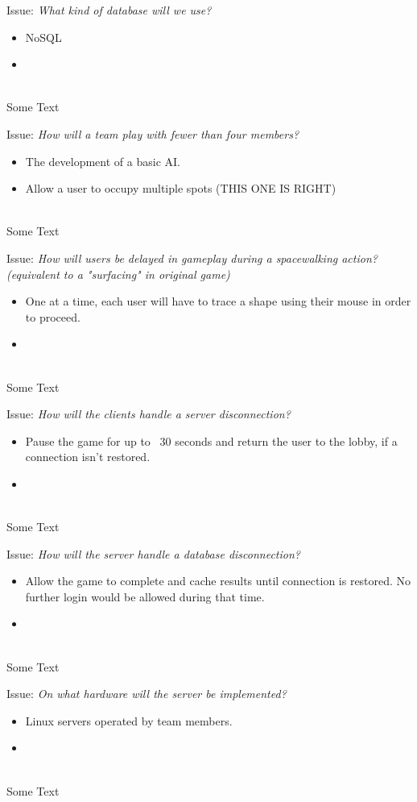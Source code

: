Issue: \textit{What kind of database will we use?}
\\
  \begin{itemize}
    \item NoSQL
    \item 
  \end{itemize}
\\
Some Text

Issue: \textit{How will a team play with fewer than four members?}
\\
  \begin{itemize}
    \item The development of a basic AI.
    \item Allow a user to occupy multiple spots (THIS ONE IS RIGHT)
  \end{itemize}
\\
Some Text

Issue: \textit{How will users be delayed in gameplay during a spacewalking action? (equivalent to a "surfacing" in original game)}
\\
  \begin{itemize}
    \item One at a time, each user will have to trace a shape using their mouse in order to proceed.
    \item 
  \end{itemize}
\\
Some Text

Issue: \textit{How will the clients handle a server disconnection?}
\\
  \begin{itemize}
    \item Pause the game for up to ~30 seconds and return the user to the lobby, if a connection isn't restored.
    \item 
  \end{itemize}
\\
Some Text

Issue: \textit{How will the server handle a database disconnection?}
\\
  \begin{itemize}
    \item Allow the game to complete and cache results until connection is restored. No further login would be allowed during that time.
    \item 
  \end{itemize}
\\
Some Text

Issue: \textit{On what hardware will the server be implemented?}
\\
  \begin{itemize}
    \item Linux servers operated by team members.
    \item 
  \end{itemize}
\\
Some Text
